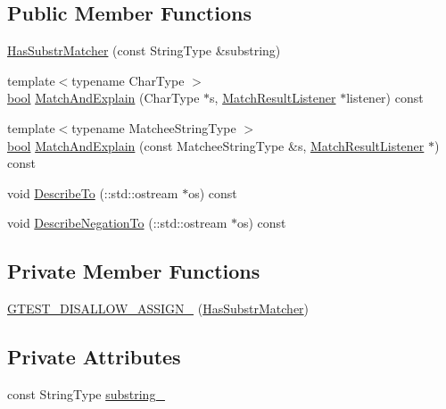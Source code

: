 \subsection*{Public Member Functions}
\begin{DoxyCompactItemize}
\item 
\hyperlink{classtesting_1_1internal_1_1HasSubstrMatcher_a395efacb13a89e5010b9ec4a00a16f00}{Has\+Substr\+Matcher} (const String\+Type \&substring)
\item 
{\footnotesize template$<$typename Char\+Type $>$ }\\\hyperlink{classbool}{bool} \hyperlink{classtesting_1_1internal_1_1HasSubstrMatcher_a68e0f4e2814c3c80c61011e66ad73839}{Match\+And\+Explain} (Char\+Type $\ast$s, \hyperlink{classtesting_1_1MatchResultListener}{Match\+Result\+Listener} $\ast$listener) const
\item 
{\footnotesize template$<$typename Matchee\+String\+Type $>$ }\\\hyperlink{classbool}{bool} \hyperlink{classtesting_1_1internal_1_1HasSubstrMatcher_a11629040f168cefaaad4ecdbde17a0dc}{Match\+And\+Explain} (const Matchee\+String\+Type \&s, \hyperlink{classtesting_1_1MatchResultListener}{Match\+Result\+Listener} $\ast$) const
\item 
void \hyperlink{classtesting_1_1internal_1_1HasSubstrMatcher_a278f177d2cbdfed29f6755ee0739a521}{Describe\+To} (\+::std\+::ostream $\ast$os) const
\item 
void \hyperlink{classtesting_1_1internal_1_1HasSubstrMatcher_aa79638f9d3a0c2eb67bc76432f35be1f}{Describe\+Negation\+To} (\+::std\+::ostream $\ast$os) const
\end{DoxyCompactItemize}
\subsection*{Private Member Functions}
\begin{DoxyCompactItemize}
\item 
\hyperlink{classtesting_1_1internal_1_1HasSubstrMatcher_a05fa9d568e67101a865c9e92cf28b385}{G\+T\+E\+S\+T\+\_\+\+D\+I\+S\+A\+L\+L\+O\+W\+\_\+\+A\+S\+S\+I\+G\+N\+\_\+} (\hyperlink{classtesting_1_1internal_1_1HasSubstrMatcher}{Has\+Substr\+Matcher})
\end{DoxyCompactItemize}
\subsection*{Private Attributes}
\begin{DoxyCompactItemize}
\item 
const String\+Type \hyperlink{classtesting_1_1internal_1_1HasSubstrMatcher_ac15185527d4f52eda4574c8b845a52f3}{substring\+\_\+}
\end{DoxyCompactItemize}


